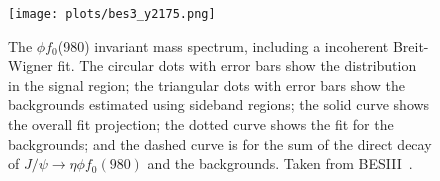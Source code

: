\begin{figure}[H]
    \centering
        \texttt{[image: plots/bes3\_y2175.png]}
        \caption{The $\phi f_0$(980) invariant mass spectrum, including a incoherent Breit-Wigner fit. The circular dots with error bars show the distribution in the signal region; the triangular dots with error bars show the backgrounds estimated using sideband regions; the solid curve shows the overall fit projection; the dotted curve shows the fit for the backgrounds; and the dashed curve is for the sum of the direct decay of $J/\psi \rightarrow \eta \phi f_0(980)$ and the backgrounds.
         Taken from BESIII~\cite{20}.}
        \label{fig.1.4.3}
\end{figure}